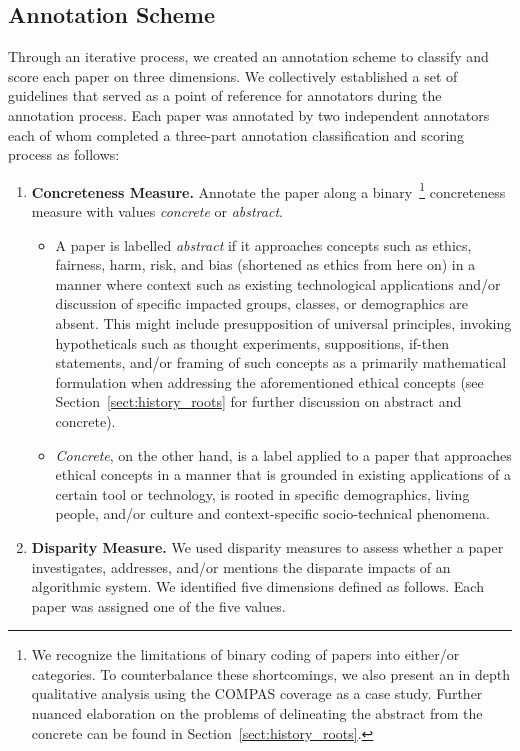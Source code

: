 \documentclass[manuscript]{acmart}
\begin{document}
\subsection{Annotation Scheme}
Through an iterative process, we created an annotation scheme to classify and score each paper on three dimensions. We collectively established a set of guidelines that served as a point of reference for annotators during the annotation process. 
Each paper was annotated by two independent annotators each of whom completed a three-part annotation classification and scoring process as follows:
\begin{enumerate}
    \item \textbf{Concreteness Measure.} Annotate the paper along a binary~\footnote{We recognize the limitations of binary coding of papers into either/or categories. To counterbalance these shortcomings, we also present an in depth qualitative analysis using the COMPAS coverage as a case study. Further nuanced elaboration on the problems of delineating the abstract from the concrete can be found in Section~\ref{sect:history_roots}. 
    } concreteness measure with values \textit{concrete} or \textit{abstract}. 
        \begin{itemize}
            \item A paper is labelled \textit{abstract} if it approaches concepts such as ethics, fairness, harm, risk, and bias (shortened as ethics from here on) in a manner where context such as existing technological applications and/or discussion of specific impacted groups, classes, or demographics are absent. This might include presupposition of universal principles, invoking hypotheticals such as thought experiments, suppositions, if-then statements, and/or framing of such concepts as a primarily mathematical formulation when addressing the aforementioned ethical concepts (see Section~\ref{sect:history_roots} for further discussion on abstract and concrete). 
            \item \textit{Concrete}, on the other hand, is a label applied to a paper that approaches ethical concepts in a manner that is grounded in existing applications of a certain tool or technology, is rooted in specific demographics, living people, and/or culture and context-specific socio-technical phenomena.    
        \end{itemize}   
    \item \textbf{Disparity Measure.} We used disparity measures to assess whether a paper investigates, addresses, and/or mentions the disparate impacts of an algorithmic system. We identified five dimensions defined as follows. Each paper was assigned one of the five values.   

\end{enumerate}
\end{document}
